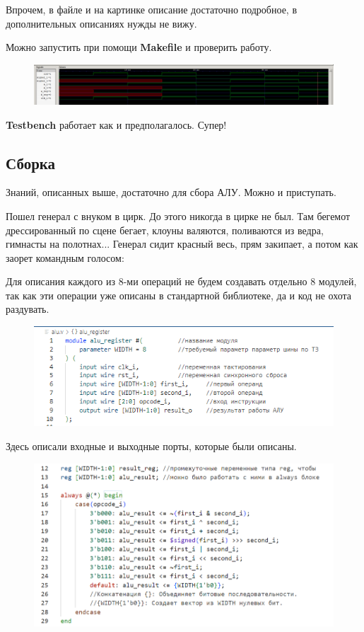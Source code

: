 \documentclass[a4paper,12pt]{article} %
\begin{document}
Впрочем, в файле и на картинке описание достаточно подробное, в дополнительных описаниях нужды не вижу.

Можно запустить при помощи \textbf{Makefile} и проверить работу.
\begin{figure}[H]
    \centering
    \includegraphics[width=1\linewidth]{Learning/TB.png}
\end{figure}
\textbf{Testbench} работает как и предполагалось. Супер!

\subsection{Сборка}

Знаний, описанных выше, достаточно для сбора АЛУ. Можно и приступать. 

Пошел генерал с внуком в цирк. До этого никогда в цирке не был. Там бегемот дрессированный по сцене бегает, клоуны валяются, поливаются из ведра, гимнасты на полотнах...
Генерал сидит красный весь, прям закипает, а потом как заорет командным голосом:

Для описания каждого из 8-ми операций не будем создавать отдельно 8 модулей, так как эти операции уже описаны в стандартной библиотеке, да и код не охота раздувать.

\begin{figure}[H]
    \centering
    \includegraphics[width=1\linewidth]{Final/variables.png}
\end{figure}

Здесь описали входные и выходные порты, которые были описаны.

\begin{figure}[H]
    \centering
    \includegraphics[width=1\linewidth]{Final/opers.png}
\end{figure}
\end{document}
